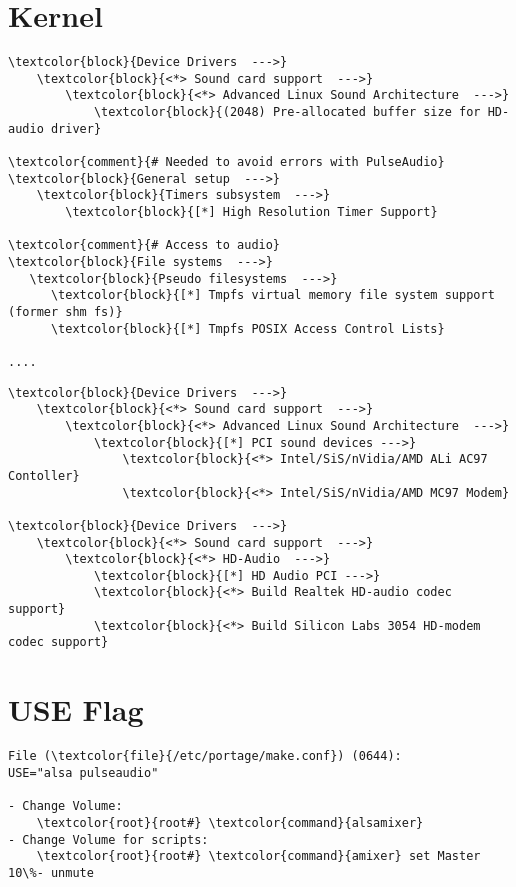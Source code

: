 \documentclass[10pt, a4paper, onecolumn, openany]{book}         %
\begin{document}
\section{Kernel}
\begin{Verbatim}[commandchars=\\\{\}]
\textcolor{block}{Device Drivers  --->}
    \textcolor{block}{<*> Sound card support  --->}
        \textcolor{block}{<*> Advanced Linux Sound Architecture  --->}
            \textcolor{block}{(2048) Pre-allocated buffer size for HD-audio driver}

\textcolor{comment}{# Needed to avoid errors with PulseAudio}
\textcolor{block}{General setup  --->}
    \textcolor{block}{Timers subsystem  --->}
        \textcolor{block}{[*] High Resolution Timer Support}

\textcolor{comment}{# Access to audio}        
\textcolor{block}{File systems  --->}
   \textcolor{block}{Pseudo filesystems  --->}
      \textcolor{block}{[*] Tmpfs virtual memory file system support (former shm fs)}
      \textcolor{block}{[*] Tmpfs POSIX Access Control Lists}
      
....  
\end{Verbatim}
\begin{Verbatim}[commandchars=\\\{\}]
\textcolor{block}{Device Drivers  --->}
    \textcolor{block}{<*> Sound card support  --->}
        \textcolor{block}{<*> Advanced Linux Sound Architecture  --->}      
            \textcolor{block}{[*] PCI sound devices --->}
                \textcolor{block}{<*> Intel/SiS/nVidia/AMD ALi AC97 Contoller}
                \textcolor{block}{<*> Intel/SiS/nVidia/AMD MC97 Modem}
                
\textcolor{block}{Device Drivers  --->}
    \textcolor{block}{<*> Sound card support  --->}
        \textcolor{block}{<*> HD-Audio  --->}      
            \textcolor{block}{[*] HD Audio PCI --->}
            \textcolor{block}{<*> Build Realtek HD-audio codec support}
            \textcolor{block}{<*> Build Silicon Labs 3054 HD-modem codec support}                
\end{Verbatim}

\section{USE Flag}
\begin{Verbatim}[commandchars=\\\{\}]
File (\textcolor{file}{/etc/portage/make.conf}) (0644):
USE="alsa pulseaudio"

- Change Volume:
    \textcolor{root}{root#} \textcolor{command}{alsamixer}
- Change Volume for scripts:
    \textcolor{root}{root#} \textcolor{command}{amixer} set Master 10\%- unmute
\end{Verbatim}
\end{document}
